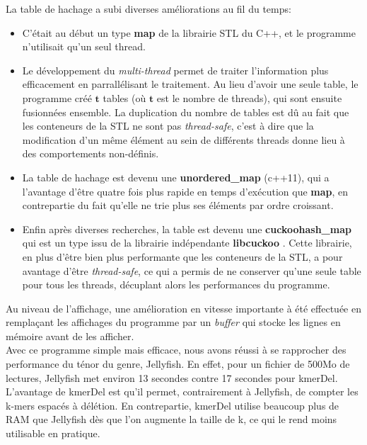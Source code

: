 \documentclass{report}
\begin{document}
    La table de hachage a subi diverses améliorations au fil du temps:\\
    \begin{itemize}
      \item C'était au début un type \textbf{map} de la librairie STL du C++, et le programme n'utilisait qu'un seul thread.\\
      \item Le développement du \textit{multi-thread} permet de traiter l'information plus efficacement en parrallélisant le traitement. Au lieu d'avoir une seule table, le programme créé $\mathbf{t}$ tables (où $\mathbf{t}$ est le nombre de threads), qui sont ensuite fusionnées ensemble. La duplication du nombre de tables est dû au fait que les conteneurs de la STL ne sont pas \textit{thread-safe}, c'est à dire que la modification d'un même élément au sein de différents threads donne lieu à des comportements non-définis.\\
      \item La table de hachage est devenu une \textbf{unordered\_map} (c++11), qui a l'avantage d'être quatre fois plus rapide en temps d'exécution que \textbf{map}, en contrepartie du fait qu'elle ne trie plus ses éléments par ordre croissant.\\
      \item Enfin après diverses recherches, la table est devenu une \textbf{cuckoohash\_map} qui est un type issu de la librairie indépendante \textbf{libcuckoo} \cite{Cuckoo2013} \cite{Cuckoo2014}. Cette librairie, en plus d'être bien plus performante que les conteneurs de la STL, a pour avantage d'être \textit{thread-safe}, ce qui a permis de ne conserver qu'une seule table pour tous les threads, décuplant alors les performances du programme.
    \end{itemize}\bigskip

    Au niveau de l'affichage, une amélioration en vitesse importante à été effectuée en remplaçant les affichages du programme par un \textit{buffer} qui stocke les lignes en mémoire avant de les afficher.\\

    Avec ce programme simple mais efficace, nous avons réussi à se rapprocher des performance du ténor du genre, Jellyfish. En effet, pour un fichier de 500Mo de lectures, Jellyfish met environ 13 secondes contre 17 secondes pour kmerDel. L'avantage de kmerDel est qu'il permet, contrairement à Jellyfish, de compter les k-mers espacés à délétion. En contrepartie, kmerDel utilise beaucoup plus de RAM que Jellyfish dès que l'on augmente la taille de k, ce qui le rend moins utilisable en pratique.
    \newpage
\end{document}
